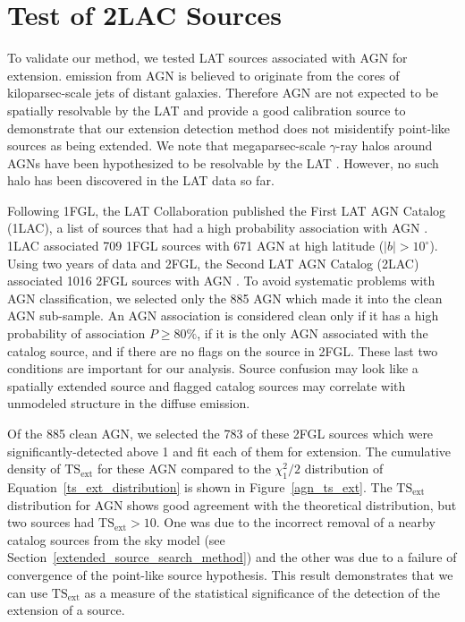 \documentclass[12pt,preprint]{aastex}
\newcommand{\gev}{\text{GeV}\xspace}
\newcommand{\tsext}{{\ensuremath{\text{TS}_{\text{ext}}}}\xspace}
\newcommand{\degree}{^\circ\xspace}
\begin{document}
\section{Test of 2LAC Sources}
\label{test_2lac_sources}

To validate our method, we tested LAT sources associated with AGN for
extension.  \gev emission from AGN is believed to originate from the
cores of kiloparsec-scale jets of distant galaxies.  Therefore AGN are
not expected to be spatially resolvable by the LAT and provide a good
calibration source to demonstrate that our extension detection method
does not misidentify point-like sources as being extended.  We note that
megaparsec-scale $\gamma$-ray halos around AGNs have been hypothesized
to be resolvable by the LAT \citep{pair_halo_paper}. However, no such
halo has been discovered in the LAT data so far.

Following 1FGL, the LAT Collaboration published the First LAT AGN Catalog
(1LAC), a list of sources that had a high probability association with
AGN \citep{first_agn_cat}.  1LAC associated 709 1FGL sources with 671
AGN at high latitude ($|b|>10\degree$).  Using two years of data
and 2FGL, the Second LAT AGN Catalog (2LAC) associated 1016 2FGL sources
with AGN \citep{second_agn_cat}.  To avoid systematic problems with AGN
classification, we selected only the 885 AGN which made it into
the clean AGN sub-sample.  An AGN association is considered clean only
if it has a high probability of association $P\ge 80\%$, if it is the
only AGN associated with the catalog source, and if there are no flags
on the source in 2FGL. These last two conditions are important for our
analysis. Source confusion may look like a spatially extended source
and flagged catalog sources may correlate with unmodeled structure in
the diffuse emission.

Of the 885 clean AGN, we selected the 783 of these 2FGL sources which
were significantly-detected above 1 \gev and fit each of them for extension.
The cumulative density of \tsext for these AGN compared to the
$\chi^2_1/2$ distribution of Equation~\ref{ts_ext_distribution}
is
shown in Figure~\ref{agn_ts_ext}. 
The \tsext distribution for AGN shows good agreement with the
theoretical distribution, but two sources had $\tsext>10$.  One was due
to the incorrect removal of a nearby catalog sources from
the sky model (see
Section~\ref{extended_source_search_method}) and the other was due to a
failure of convergence of the point-like source hypothesis.  This result demonstrates
that we can use \tsext as a measure of the statistical significance of
the detection of the extension of a source.
\end{document}
